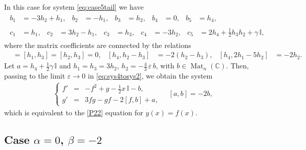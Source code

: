 \documentclass{article}
\theoremstyle{plain}
\DeclareMathOperator{\Mat}{Mat}
\begin{document}
In this case for system \eqref{eq:case5tail} we have
\begin{gather*}
    \begin{aligned}
    b_1 
    &= - 3 h_2 + h_1,
    &
    b_2
    &= - h_1,
    &
    b_3
    &= h_2,
    &
    b_4
    &= 0,
    &
    b_5
    &= h_4,
    \end{aligned}
    \\[1mm]
    \begin{aligned}
    c_1
    &= h_1,
    &
    c_2 
    &= 3 h_2 - h_1,
    &
    c_3
    &= h_3,
    &
    c_4 
    &= - 3 h_2,
    &
    c_5
    &= 2 h_4 + \frac12 h_3 h_2 + \gamma \, \mathbb{I},
    \end{aligned}
\end{gather*}
where the matrix coefficients are connected by the relations
\begin{align*}
    [h_1, h_2]
    &= [h_1, h_3]
    = [h_2, h_3]
    = 0,
    &
    [h_4, h_2 - h_3]
    &= - 2 (h_2 - h_3),
    &
    [h_4, 2 h_1 - 5 h_2]
    &= - 2 h_2.
\end{align*}
Let $a = h_4 + \frac12 \gamma \, \mathbb{I}$ and $h_1 = h_3 = 3 h_2$, $h_2 = - \frac43 \, \varepsilon \, b$, with $b \in \Mat_n (\mathbb{C})$. Then, passing to the limit $\varepsilon \to 0$ in \eqref{eq:sys4tosys2}, we obtain the system
\begin{gather*}
    \left\{
    \begin{array}{lcl}
    f'
    &=& - f^2 + g - \frac12 x \, \mathbb{I} - b,
    \\[2mm]
    g'
    &=& 3 f g - g f - 2 [f, b] + a,
    \end{array}
    \right.
    \quad 
    [a, b]
    = - 2 b,
\end{gather*}
which is equivalent to the \ref{P22} equation for $y (x) = f (x)$. 

\subsection{Case \texorpdfstring{$\alpha = 0$, $\beta = - 2$}{alpha = 0, beta = -2}}
\end{document}
